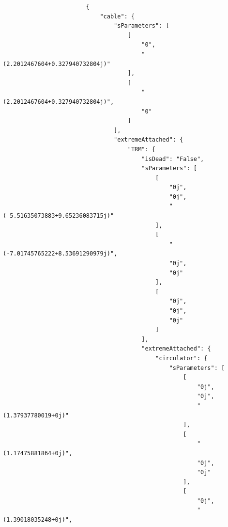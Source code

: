\begin{verbatim}
                        {
                            "cable": {
                                "sParameters": [
                                    [
                                        "0",
                                        "(2.2012467604+0.327940732804j)"
                                    ],
                                    [
                                        "(2.2012467604+0.327940732804j)",
                                        "0"
                                    ]
                                ],
                                "extremeAttached": {
                                    "TRM": {
                                        "isDead": "False",
                                        "sParameters": [
                                            [
                                                "0j",
                                                "0j",
                                                "(-5.51635073883+9.65236083715j)"
                                            ],
                                            [
                                                "(-7.01745765222+8.53691290979j)",
                                                "0j",
                                                "0j"
                                            ],
                                            [
                                                "0j",
                                                "0j",
                                                "0j"
                                            ]
                                        ],
                                        "extremeAttached": {
                                            "circulator": {
                                                "sParameters": [
                                                    [
                                                        "0j",
                                                        "0j",
                                                        "(1.37937780019+0j)"
                                                    ],
                                                    [
                                                        "(1.17475881864+0j)",
                                                        "0j",
                                                        "0j"
                                                    ],
                                                    [
                                                        "0j",
                                                        "(1.39018035248+0j)",

\end{verbatim}

